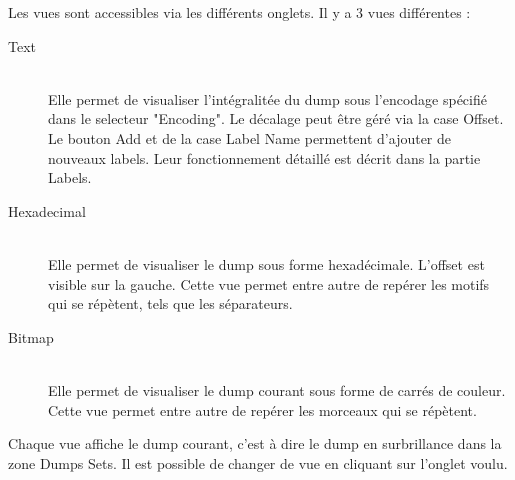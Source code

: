 Les vues sont accessibles via les différents onglets. Il y a 3 vues différentes :
\begin{description}
  \item[Text] \hfill \\
  Elle permet de visualiser l'intégralitée du dump sous l'encodage spécifié dans le selecteur "Encoding". Le décalage peut être géré via la case Offset. Le bouton Add et de la case Label Name permettent d'ajouter de nouveaux labels. Leur fonctionnement détaillé est décrit dans la partie Labels.
  
  \item[Hexadecimal] \hfill \\
  Elle permet de visualiser le dump sous forme hexadécimale. L'offset est visible sur la gauche. Cette vue permet entre autre de repérer les motifs qui se répètent, tels que les séparateurs.

  \item[Bitmap] \hfill \\
  Elle permet de visualiser le dump courant sous forme de carrés de couleur. Cette vue permet entre autre de repérer les morceaux qui se répètent.
\end{description}

Chaque vue affiche le dump courant, c'est à dire le dump en surbrillance dans la zone Dumps Sets. Il est possible de changer de vue en cliquant sur l'onglet voulu.

